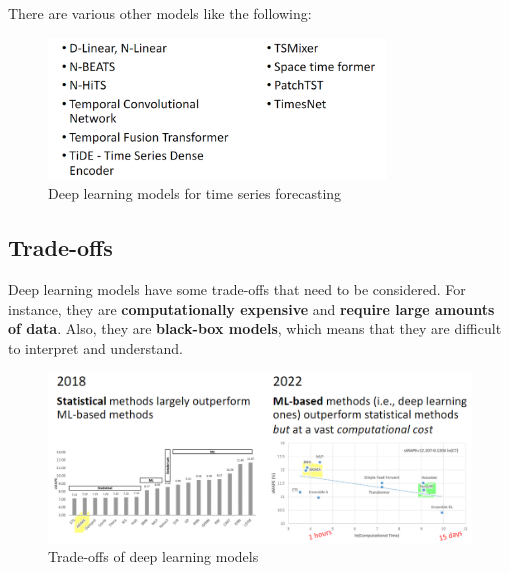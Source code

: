 There are various other models like the following:

\begin{figure}[H]
    \centering
    \includegraphics[width=0.8\textwidth]{figures/other_models.png}
    \caption{Deep learning models for time series forecasting}
    \label{fig:deep_learning_models}
\end{figure}

\subsection{Trade-offs}

Deep learning models have some trade-offs that need to be considered. For instance,
they are \textbf{computationally expensive} and \textbf{require large amounts of data}.
Also, they are \textbf{black-box models}, which means that they are difficult to interpret
and understand.

\begin{figure}[H]
    \centering
    \includegraphics[width=1\textwidth]{figures/trade_offs.png}
    \caption{Trade-offs of deep learning models}
    \label{fig:trade_offs}
\end{figure}
